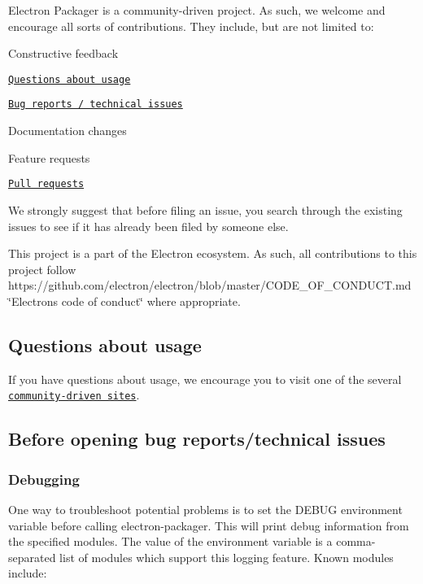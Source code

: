 Electron Packager is a community-\/driven project. As such, we welcome and encourage all sorts of contributions. They include, but are not limited to\+:


\begin{DoxyItemize}
\item Constructive feedback
\item \href{#questions-about-usage}{\tt Questions about usage}
\item \href{#before-opening-bug-reportstechnical-issues}{\tt Bug reports / technical issues}
\item Documentation changes
\item Feature requests
\item \href{#filing-pull-requests}{\tt Pull requests}
\end{DoxyItemize}

We strongly suggest that before filing an issue, you search through the existing issues to see if it has already been filed by someone else.

This project is a part of the Electron ecosystem. As such, all contributions to this project follow https\+://github.com/electron/electron/blob/master/\+C\+O\+D\+E\+\_\+\+O\+F\+\_\+\+C\+O\+N\+D\+U\+C\+T.\+md \char`\"{}\+Electron\textquotesingle{}s code of conduct\char`\"{} where appropriate.

\subsection*{Questions about usage}

If you have questions about usage, we encourage you to visit one of the several \href{https://github.com/electron/electron#community}{\tt community-\/driven sites}.

\subsection*{Before opening bug reports/technical issues}

\subsubsection*{Debugging}

One way to troubleshoot potential problems is to set the {\ttfamily D\+E\+B\+UG} environment variable before calling electron-\/packager. This will print debug information from the specified modules. The value of the environment variable is a comma-\/separated list of modules which support this logging feature. Known modules include\+:


